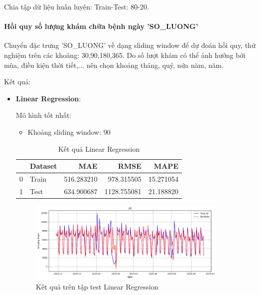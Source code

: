     Chia tập dữ liệu huấn luyện: Train-Test: 80-20.

    \paragraph{Hồi quy số lượng khám chữa bệnh ngày 'SO\_LUONG'}
    \leavevmode

    Chuyển đặc trưng 'SO\_LUONG' về dạng sliding window để dự đoán hồi quy, thử nghiệm trên các khoảng: 30,90,180,365. Do số lượt khám có thể ảnh hưởng bởi mùa, điều kiện thời tiết,... nên chọn khoảng tháng, quý, nửa năm, năm.

    Kết quả:
    \begin{itemize}
        \item \textbf{Linear Regression}: 
        
            Mô hình tốt nhất:
            \begin{itemize}
                \item Khoảng sliding window: 90
            \end{itemize}

            \begin{table}[htbp]
            \centering
            \caption{Kết quả Linear Regression}
            \label{tab:yte-sl-lireg}
            \begin{tabular}{llrrr}
            \hline
             & Dataset & MAE & RMSE & MAPE \\
            \hline
            0 & Train & 516.283210 & 978.315505 & 15.271054 \\
            1 & Test & 634.900687 & 1128.755081 & 21.188820 \\
            \hline
            \end{tabular}
            \end{table}
  
            
            \FloatBarrier

            \begin{figure}[htp]
                \centering
                \includegraphics[width=0.90\textwidth]{images/TS_yte_pred_cmp_LR.png}
                \caption{Kết quả trên tập test Linear Regression}
                \label{fig:TS_yte_pred_cmp_LR}
            \end{figure}
        

\end{itemize}
